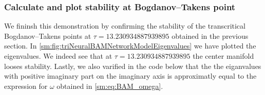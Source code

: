 \subsubsection{Calculate and plot stability at Bogdanov--Takens point}
We fininsh this demonstration by confirming the stability
of the transcritical Bogdanov--Takens points at $\tau = 13.230934887939895$
obtained in the previous section. In \cref{sm:fig:triNeuralBAMNetworkModelEigenvalues}
we have plotted the eigenvalues. We indeed see that at $\tau = 13.230934887939895$
the center manifold looses stability. Lastly, we also varified in the code
below that the the eiganvalues with positive imaginary part on the imaginary axis
is approximatly equal to the expression for $\omega$ obtained in \cref{sm:eq:BAM_omega}. 
\inputminted[firstline=459, lastline=467]{julia}{\pathToJuliaFiles/triNeuralBAMNetworkModel_simulation_article.jl}

